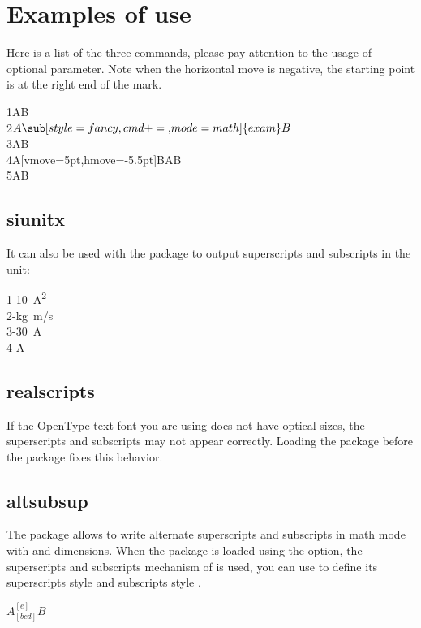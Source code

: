 \documentclass[load-preamble+]{cnltx-doc}
\begin{document}
\section{Examples of use}
Here is a list of the three commands, please pay attention to the usage of optional parameter. Note when the horizontal move is negative, the starting point is at the right end of the mark.
\begin{demohigh}
1AB \\
2$A\sub[style=fancy,cmd+=\mathsf,mode=math]{exam}B$ \\
3AB \\
4A[vmove=5pt,hmove=-5.5pt]BAB \\
5AB
\end{demohigh}

\subsection{siunitx}
It can also be used with the  package to output superscripts and subscripts in the unit:
\begin{demohigh}
1-\qty[mode=text]{10}{A^2} \\
2-\unit[mode=math]{kg.m/s} \\
3-\qty[mode=text]{30}{A} \\
4-\unit[mode=text]{A}
\end{demohigh}

\subsection{realscripts}
If the OpenType text font you are using does not have optical sizes, the superscripts and subscripts may not appear correctly. Loading the  package before the  package fixes this behavior.
\begin{codehigh}
\usepackage{realscripts,spbmark}
\end{codehigh}

\subsection{altsubsup}
The  package allows to write alternate superscripts and subscripts in math mode with \code{\^{}} and \code{\_{}} dimensions. When the package is loaded using the  option, the superscripts and subscripts mechanism of  is used, you can use  to define its superscripts style  and subscripts style .
\begin{demohigh}
$A_[bcd]^[e]B$
\end{demohigh}
\end{document}
